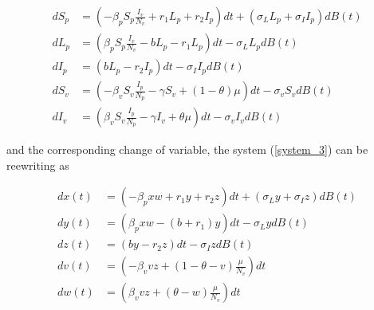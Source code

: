 \begin{align}\label{system_3}
	d S_p &=
		\left(-\beta_p S_p \frac{I_v}{N_v} + r_1 L_p + r_2 I_p\right)dt + (\sigma_L L_p + \sigma_I I_p)dB(t) \\
	dL_p &=
		\left(\beta_p S_p \frac{I_v}{N_v} - b L_p - r_1 L_p\right)dt - \sigma_L L_p dB(t) \\
	d I_p &=
		\left(b L_p - r_2 I_p\right)dt -\sigma_I I_p dB(t) \\
	dS_v &=
		\left(-\beta_v S_v \frac{I_p}{N_p} -\gamma S_v +(1-\theta) \mu\right)dt - \sigma_v S_v dB(t) \\
	d I_v &=
		\left(\beta_v S_v \frac{I_p}{N_p} -\gamma I_v + \theta \mu\right)dt - \sigma_v I_v dB(t)
\end{align}

and the corresponding change of variable, the system (\ref{system_3}) can be reewriting as

\begin{align}\label{system_4}
	d x(t) &=
		(-\beta_p x w + r_1 y + r_2 z)dt +(\sigma_L y + \sigma_I z)dB(t) \\
	dy(t) &=
		(\beta_p x w - (b + r_1) y)dt - \sigma_L y dB(t)\\
	dz(t) &=
		(b y - r_2 z)dt -\sigma_I z dB(t)\\
	dv(t) &=
		\left(-\beta_v v z  +(1-\theta-v)\frac{\mu}{N_v}\right)dt \\
	dw(t) &=
		\left(\beta_v v z + (\theta-w) \frac{\mu}{N_v}\right)dt
\end{align}























